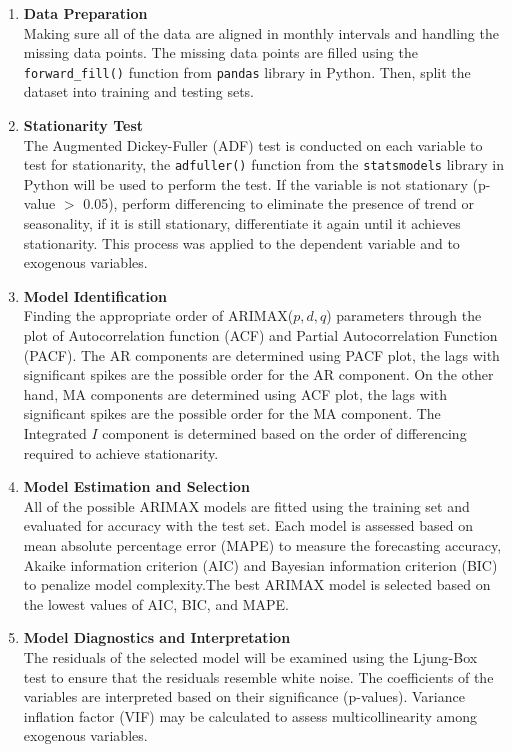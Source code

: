 \documentclass[11pt]{article}
\begin{document}
\begin{enumerate}
    \item \textbf{Data Preparation}\\
    Making sure all of the data are aligned in monthly intervals and handling the missing data points. The missing data points are filled using the \texttt{forward\_fill()} function from \texttt{pandas} library in Python. Then, split the dataset into training and testing sets. 
    \item \textbf{Stationarity Test}\\
    The Augmented Dickey-Fuller (ADF) test is conducted on each variable to test for stationarity, the \texttt{adfuller()} function from the \texttt{statsmodels} library in Python will be used to perform the test. If the variable is not stationary (p-value $>$ 0.05), perform differencing to eliminate the presence of trend or seasonality, if it is still stationary, differentiate it again until it achieves stationarity. This process was applied to the dependent variable and to exogenous variables.
    \item \textbf{Model Identification}\\
    Finding the appropriate order of ARIMAX($p,d,q$) parameters through the plot of Autocorrelation function (ACF) and Partial Autocorrelation Function (PACF). The AR components are determined using PACF plot, the lags with significant spikes are the possible order for the AR component. On the other hand, MA components are determined using ACF plot, the lags with significant spikes are the possible order for the MA component. The Integrated $I$ component is determined based on the order of differencing required to achieve stationarity. 
    \item \textbf{Model Estimation and Selection}\\
    All of the possible ARIMAX models are fitted using the training set and evaluated for accuracy with the test set. Each model is assessed based on mean absolute percentage error (MAPE) to measure the forecasting accuracy, Akaike information criterion (AIC) and Bayesian information criterion (BIC) to penalize model complexity.The best ARIMAX model is selected based on the lowest values of AIC, BIC, and MAPE. 
    \item \textbf{Model Diagnostics and Interpretation}\\
    The residuals of the selected model will be examined using the Ljung-Box test to ensure that the residuals resemble white noise. The coefficients of the variables are interpreted based on their significance (p-values). Variance inflation factor (VIF) may be calculated to assess multicollinearity among exogenous variables. 

\end{enumerate}
\end{document}
